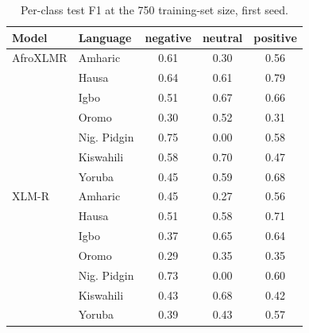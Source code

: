 \begin{table}[t]
\centering
\caption{Per-class test F1 at the 750 training-set size, first seed.}
\label{tab:per_class_f1}
\small
\begin{tabular}{llccc}
\toprule
Model & Language & negative & neutral & positive \\
\midrule
AfroXLMR & Amharic & 0.61 & 0.30 & 0.56 \\
 & Hausa & 0.64 & 0.61 & 0.79 \\
 & Igbo & 0.51 & 0.67 & 0.66 \\
 & Oromo & 0.30 & 0.52 & 0.31 \\
 & Nig. Pidgin & 0.75 & 0.00 & 0.58 \\
 & Kiswahili & 0.58 & 0.70 & 0.47 \\
 & Yoruba & 0.45 & 0.59 & 0.68 \\
\midrule
XLM-R & Amharic & 0.45 & 0.27 & 0.56 \\
 & Hausa & 0.51 & 0.58 & 0.71 \\
 & Igbo & 0.37 & 0.65 & 0.64 \\
 & Oromo & 0.29 & 0.35 & 0.35 \\
 & Nig. Pidgin & 0.73 & 0.00 & 0.60 \\
 & Kiswahili & 0.43 & 0.68 & 0.42 \\
 & Yoruba & 0.39 & 0.43 & 0.57 \\
\bottomrule
\end{tabular}
\end{table}